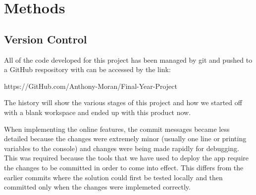 \chapter{Methods}
\label{chapter2}

\section{Version Control}
All of the code developed for this project has been managed by git and pushed to a GitHub respository with can be accessed by the link:

\begin{center}
    https://GitHub.com/Anthony-Moran/Final-Year-Project
\end{center}

The history will show the various stages of this project and how we started off with a blank workspace and ended up with this product now.

When implementing the online features, the commit messages became less detailed because the changes were extremely minor (usually one line or printing variables to the console) and changes were being made rapidly for debugging. This was required because the tools that we have used to deploy the app require the changes to be committed in order to come into effect. This differs from the earlier commits where the solution could first be tested locally and then committed only when the changes were implemeted correctly.


